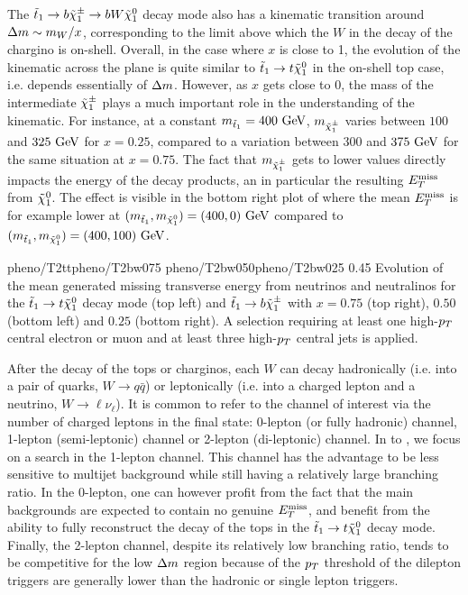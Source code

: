         The $\tilde{t}_1 \rightarrow b \tilde{\chi}_1^\pm \rightarrow b W \tilde{\chi}_1^0$ decay mode also
        has a kinematic transition around $\Delta m \sim m_W/x$, corresponding to the limit
        above which the $W$ in the decay of the chargino is on-shell. Overall, in the
        case where $x$ is close to 1, the evolution of the kinematic across the plane
        is quite similar to $\tilde{t}_1 \rightarrow t \tilde{\chi}_1^0$ in the on-shell top case,
        i.e. depends essentially of $\Delta m$.
        However, as $x$ gets close to 0, the mass of the intermediate $\tilde{\chi}_1^\pm$ plays
        a much important role in the understanding of the kinematic. For instance, at a
        constant $m_{\tilde{t}_1} = 400~\text{GeV}$, $m_{\tilde{\chi}_1^\pm}$ varies between $100$
        and $325~\text{GeV}$ for $x = 0.25$, compared to a variation between $300$ and $375~\text{GeV}$
        for the same situation at $x = 0.75$. The fact that $m_{\tilde{\chi}_1^\pm}$ gets to
        lower values directly impacts the energy of the decay products, an in particular
        the resulting $E_T^\text{miss}$ from $\tilde{\chi}_1^0$. The effect is visible in the bottom right
        plot of  where the mean $E_T^\text{miss}$ is for example lower at
        $(m_{\tilde{t}_1},m_{\tilde{\chi}_1^0}) = (400,0) ~\text{GeV}$ compared to $(m_{\tilde{t}_1},
        m_{\tilde{\chi}_1^0}) = (400,100) ~\text{GeV}$.

                     {pheno/T2tt}{pheno/T2bw075}
                     {pheno/T2bw050}{pheno/T2bw025}
                     {0.45}
                     {Evolution of the mean generated missing transverse energy from neutrinos
                     and neutralinos for the $\tilde{t}_1 \rightarrow t \tilde{\chi}_1^0$
                     decay mode (top left) and $\tilde{t}_1 \rightarrow b \tilde{\chi}_1^\pm$ with
                     $x = 0.75$ (top right), $0.50$ (bottom left) and $0.25$ (bottom right).
                     A selection requiring at least one high-$p_T$ central
                     electron or muon and at least three high-$p_T$ central jets is applied.}

    After the decay of the tops or charginos, each $W$ can decay hadronically (i.e. into
    a pair of quarks, $W \rightarrow q\bar{q}$) or leptonically (i.e. into a charged
    lepton and a neutrino, $W \rightarrow \ell \nu_{\ell}$). It is common to refer to
    the channel of interest via the number of charged leptons in the final state: 0-lepton
    (or fully hadronic) channel, 1-lepton (semi-leptonic) channel or 2-lepton (di-leptonic)
    channel. In  to , we focus on
    a search in the 1-lepton channel. This channel has the advantage to be less sensitive
    to multijet background while still having a relatively large branching ratio. In the
    0-lepton, one can however profit from the fact that the main backgrounds are expected
    to contain no genuine $E_T^\text{miss}$, and benefit from the ability to fully reconstruct the
    decay of the tops in the $\tilde{t}_1 \rightarrow t \tilde{\chi}_1^0$ decay mode. Finally, the
    2-lepton channel, despite its relatively low branching ratio, tends to be competitive
    for the low $\Delta m$ region because of the $p_T$ threshold of the dilepton triggers are
    generally lower than the hadronic or single lepton triggers.


